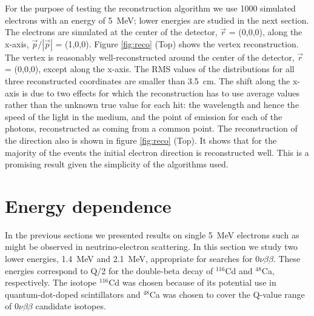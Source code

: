 \documentclass[cits]{JINST}
\begin{document}
For the purpose of testing the reconstruction algorithm we use 1000
simulated electrons with an energy of 5~MeV; lower energies are studied in the next section.
The electrons are simulated at the center of the detector, $\vec{r}$ = (0,0,0), along
the x-axis, $\vec{p}/|\vec{p}|$ = (1,0,0). Figure \ref{fig:reco} (Top)
shows the vertex reconstruction. The vertex is reasonably well-reconstructed around the center of the detector, $\vec{r}$ = (0,0,0),
except along the x-axis. The RMS values of the distributions for all three
reconstructed coordinates are smaller than 3.5~cm. The shift along
the x-axis is due to two effects for which the reconstruction has to
use average values rather than the unknown true value for each
hit: the wavelength and hence the speed of the light in the medium,
and the point of emission for each of the photons, reconstructed
as coming from a common point. The reconstruction of the direction
also is shown in figure \ref{fig:reco} (Top). It shows that for the majority
of the events the initial electron direction is reconstructed well.
This is a promising result given the simplicity of the algorithms
used.

\section{Energy dependence}
\label{edep_section}
In the previous sections we presented results on single 5~MeV electrons such as might be observed in neutrino-electron scattering.
In this section we study two lower energies, 1.4~MeV and 2.1~MeV, appropriate for searches for $0\nu\beta\beta$. These
energies correspond to Q/2 for the double-beta decay of
$^{116}$Cd and $^{48}$Ca, respectively\cite{cd1,biller}. The isotope
$^{116}$Cd was chosen because of its potential use in quantum-dot-doped
scintillators\cite{qdot,qdot2} and $^{48}$Ca was chosen
to cover the Q-value range of $0\nu\beta\beta$ candidate isotopes.
\end{document}
